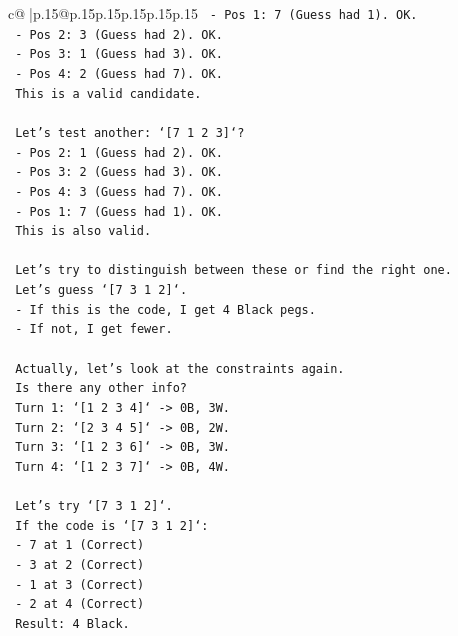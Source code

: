 \documentclass{article}
\begin{document}
{\begin{supertabular}{c@{$\;$}|p{.15\linewidth}@{}p{.15\linewidth}p{.15\linewidth}p{.15\linewidth}p{.15\linewidth}p{.15\linewidth}}
{{{\texttt{    {-} Pos 1: 7 (Guess had 1). OK.} \\
\texttt{    {-} Pos 2: 3 (Guess had 2). OK.} \\
\texttt{    {-} Pos 3: 1 (Guess had 3). OK.} \\
\texttt{    {-} Pos 4: 2 (Guess had 7). OK.} \\
\texttt{    This is a valid candidate.} \\
\\ 
\texttt{    Let's test another: `{[}7 1 2 3{]}`?} \\
\texttt{    {-} Pos 2: 1 (Guess had 2). OK.} \\
\texttt{    {-} Pos 3: 2 (Guess had 3). OK.} \\
\texttt{    {-} Pos 4: 3 (Guess had 7). OK.} \\
\texttt{    {-} Pos 1: 7 (Guess had 1). OK.} \\
\texttt{    This is also valid.} \\
\\ 
\texttt{    Let's try to distinguish between these or find the right one.} \\
\texttt{    Let's guess `{[}7 3 1 2{]}`.} \\
\texttt{    {-} If this is the code, I get 4 Black pegs.} \\
\texttt{    {-} If not, I get fewer.} \\
\\ 
\texttt{    Actually, let's look at the constraints again.} \\
\texttt{    Is there any other info?} \\
\texttt{    Turn 1: `{[}1 2 3 4{]}` {-}> 0B, 3W.} \\
\texttt{    Turn 2: `{[}2 3 4 5{]}` {-}> 0B, 2W.} \\
\texttt{    Turn 3: `{[}1 2 3 6{]}` {-}> 0B, 3W.} \\
\texttt{    Turn 4: `{[}1 2 3 7{]}` {-}> 0B, 4W.} \\
\\ 
\texttt{    Let's try `{[}7 3 1 2{]}`.} \\
\texttt{    If the code is `{[}7 3 1 2{]}`:} \\
\texttt{    {-} 7 at 1 (Correct)} \\
\texttt{    {-} 3 at 2 (Correct)} \\
\texttt{    {-} 1 at 3 (Correct)} \\
\texttt{    {-} 2 at 4 (Correct)} \\
\texttt{    Result: 4 Black.} \\
}}}
\end{supertabular}}
\end{document}
